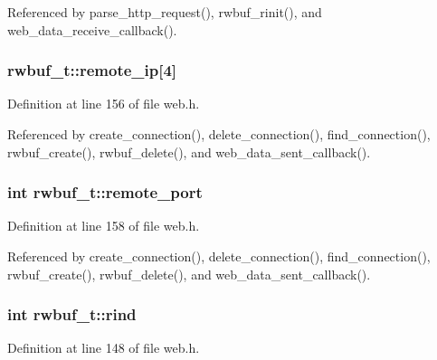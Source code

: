 Referenced by parse\-\_\-http\-\_\-request(), rwbuf\-\_\-rinit(), and web\-\_\-data\-\_\-receive\-\_\-callback().

\hypertarget{structrwbuf__t_ad83926198e358ac1a569b0da7749572c}{
\subsubsection[{remote\-\_\-ip}]{ rwbuf\-\_\-t\-::remote\-\_\-ip\mbox{[}4\mbox{]}}}\label{structrwbuf__t_ad83926198e358ac1a569b0da7749572c}


Definition at line 156 of file web.\-h.



Referenced by create\-\_\-connection(), delete\-\_\-connection(), find\-\_\-connection(), rwbuf\-\_\-create(), rwbuf\-\_\-delete(), and web\-\_\-data\-\_\-sent\-\_\-callback().

\hypertarget{structrwbuf__t_aace1e79a985cc8fab4c2093208bf3763}{
\subsubsection[{remote\-\_\-port}]{\setlength{\rightskip}{0pt plus 5cm}int rwbuf\-\_\-t\-::remote\-\_\-port}}\label{structrwbuf__t_aace1e79a985cc8fab4c2093208bf3763}


Definition at line 158 of file web.\-h.



Referenced by create\-\_\-connection(), delete\-\_\-connection(), find\-\_\-connection(), rwbuf\-\_\-create(), rwbuf\-\_\-delete(), and web\-\_\-data\-\_\-sent\-\_\-callback().

\hypertarget{structrwbuf__t_ad5cbf7a78a5f5d9aa75b38f90e0fb6af}{
\subsubsection[{rind}]{\setlength{\rightskip}{0pt plus 5cm}int rwbuf\-\_\-t\-::rind}}\label{structrwbuf__t_ad5cbf7a78a5f5d9aa75b38f90e0fb6af}


Definition at line 148 of file web.\-h.




